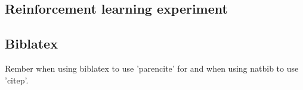\documentclass{article}
\begin{document}
\subsection{Reinforcement learning experiment}
\label{app:rl-experiment}





%    

\subsection{Biblatex}
Rember when using biblatex to use 'parencite' for \citep{kamtheDataEfficient2018} and when using natbib to use 'citep'.

%
\end{document}

